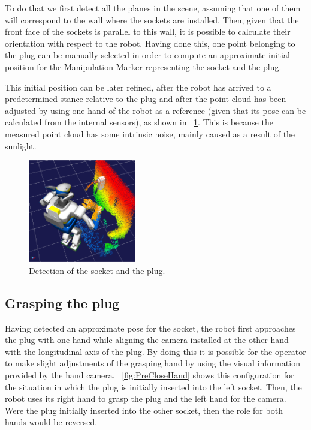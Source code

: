 		To do that we first detect all the planes in the scene, assuming that one of them will correspond
		to the wall where the sockets are installed.
		Then, given that the front face of the sockets is parallel to this wall, it is possible
		to calculate their orientation with respect to the robot.
		Having done this, one point belonging to the plug can be manually selected in order to compute
		an approximate initial position for the Manipulation Marker representing the socket and the plug.
		
		This initial position can be later refined, after the robot has arrived to a predetermined stance
		relative to the plug and after the point cloud has been adjusted by using one hand of the robot as
		a reference (given that its pose can be calculated from the internal sensors), as shown in
		\figurename~\ref{fig:SocketPlugMarker}.
		This is because the measured point cloud has some intrinsic noise, mainly caused as a result of
		the sunlight.
		
		\begin{figure}[b]
			\centering
			\includegraphics[height = 4.5cm]{img/SocketPlugMarker}
			\caption{Detection of the socket and the plug.}
			\label{fig:SocketPlugMarker}
		\end{figure}
		
	\subsection{Grasping the plug}
		
		Having detected an approximate pose for the socket, the robot first approaches the plug
		with one hand while aligning the camera installed at the other hand with the longitudinal axis
		of the plug.
		By doing this it is possible for the operator to make slight adjustments of the grasping hand
		by using the visual information provided by the hand camera.
		\figurename~\ref{fig:PreCloseHand} shows this configuration for the situation in which the plug
		is initially inserted into the left socket.
		Then, the robot uses its right hand to grasp the plug and the left hand for the camera.
		Were the plug initially inserted into the other socket, then the role for both hands would be
		reversed.
		
